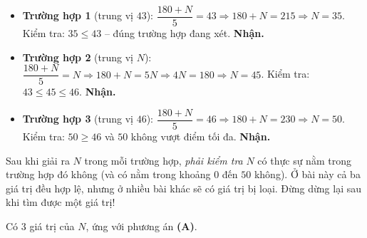{
\begin{itemize}[leftmargin=1.4em,itemsep=1pt]
\item \textbf{Trường hợp 1} (trung vị $43$): $\dfrac{180+N}{5}=43\Rightarrow 180+N=215\Rightarrow N=35$. Kiểm tra: $35\le 43$ -- đúng trường hợp đang xét. \textbf{Nhận.}
\item \textbf{Trường hợp 2} (trung vị $N$): $\dfrac{180+N}{5}=N\Rightarrow 180+N=5N\Rightarrow 4N=180\Rightarrow N=45$. Kiểm tra: $43\le 45\le 46$. \textbf{Nhận.}
\item \textbf{Trường hợp 3} (trung vị $46$): $\dfrac{180+N}{5}=46\Rightarrow 180+N=230\Rightarrow N=50$. Kiểm tra: $50\ge 46$ và $50$ không vượt điểm tối đa. \textbf{Nhận.}
\end{itemize}

\begin{warnbox}Sau khi giải ra $N$ trong mỗi trường hợp, \emph{phải kiểm tra} $N$ có thực sự nằm trong trường hợp đó không (và có nằm trong khoảng $0$ đến $50$ không). Ở bài này cả ba giá trị đều hợp lệ, nhưng ở nhiều bài khác sẽ có giá trị bị loại. Đừng dừng lại sau khi tìm được một giá trị!\end{warnbox}

Có $3$ giá trị của $N$, ứng với phương án \textbf{(A)}.
}
